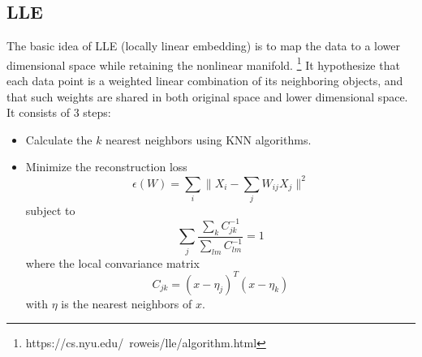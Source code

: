 \documentclass{article}
\begin{document}
{{    }

    \subsection*{LLE}
    {
        The basic idea of LLE (locally linear embedding) is to map the data to a lower dimensional space while retaining the nonlinear manifold.
        \footnote{https://cs.nyu.edu/~roweis/lle/algorithm.html} 
        It hypothesize that each data point is a weighted linear combination of its neighboring objects, 
        and that such weights are shared in both original space and lower dimensional space. It consists of 3 steps:

        \begin{itemize}
            \item Calculate the $k$ nearest neighbors using KNN algorithms.

            \item Minimize the reconstruction loss
            $$\epsilon(W) = \sum_{i}{ \lVert X_i - \sum_{j}{W_{ij} X_j} \rVert ^2}$$
            subject to $$\sum_{j} {\frac{ \sum_k C_{jk}^{-1} }{ \sum_{lm} C_{lm}^{-1} }} = 1$$
            where the local convariance matrix $$C_{jk} = (x - \eta_j)^T (x - \eta_k)$$ with $\eta$ is the nearest neighbors of $x$.
        \end{itemize}

    }
}
\end{document}
